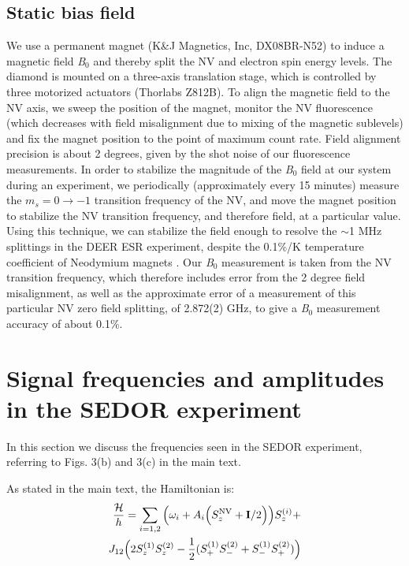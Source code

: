 \documentclass[%
 reprint,
 amsmath,amssymb,
 aps,
]{revtex4-1}
\begin{document}
\subsection{Static bias field}
We use a permanent magnet (K\&J Magnetics, Inc, DX08BR-N52) to induce a magnetic field \textit{B}$_0$ and thereby split the NV and electron spin energy levels. The diamond is mounted on a three-axis translation stage, which is controlled by three motorized actuators (Thorlabs Z812B). To align the magnetic field to the NV axis, we sweep the position of the magnet, monitor the NV fluorescence (which decreases with field misalignment due to mixing of the magnetic sublevels) and fix the magnet position to the point of maximum count rate. Field alignment precision is about 2 degrees, given by the shot noise of our fluorescence measurements. In order to stabilize the magnitude of the \textit{B}$_0$ field at our system during an experiment, we periodically (approximately every 15 minutes) measure the $m_s = 0 \rightarrow -1$ transition frequency of the NV, and move the magnet position to stabilize the NV transition frequency, and therefore field, at a particular value. Using this technique, we can stabilize the field enough to resolve the $\sim$1 MHz splittings in the DEER ESR experiment, despite the 0.1\%/K temperature coefficient of Neodymium magnets \cite{tempco}. Our \textit{B}$_0$ measurement is taken from the NV transition frequency, which therefore includes error from the 2 degree field misalignment, as well as the approximate error of a measurement of this particular NV zero field splitting, of 2.872(2) GHz, to give a \textit{B}$_0$ measurement accuracy of about 0.1\%.

\section{Signal frequencies and amplitudes in the SEDOR experiment}

In this section we discuss the frequencies seen in the SEDOR experiment, referring to Figs. 3(b) and 3(c) in the main text. 

As stated in the main text, the Hamiltonian is: 
\begin{align}
\frac{\mathcal{H}}{h} = \sum_{i = 1,2} {\Big(\omega_i + A_i\Big(S_{z}^{\text{NV}} + {\bf{I}} /2\Big)\Big)}S_{z}^{(i)} + 
\\J_{12} \Big(2 S_{z}^{(1)}S_{z}^{(2)} - \frac{1}{2}(S_{+}^{(1)} S_{-}^{(2)} + S_{-}^{(1)} S_+^{(2)})\Big)
\end{align}
\end{document}
